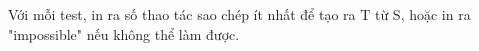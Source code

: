 Với mỗi test, in ra số thao tác sao chép ít nhất để tạo ra T từ S, hoặc in ra "impossible" nếu không thể làm được.